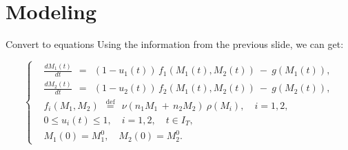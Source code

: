 \documentclass{beamer}
\begin{document}
\section{Modeling}

\begin{frame}{Convert to equations}
    Using the information from the previous slide, we can get:
    
    $$ 
    \left\{ \begin{aligned}
    & \frac{d M_1(t)}{dt} \:\: = \:\: (1 - u_1(t)) \, f_1(M_1(t), M_2(t)) \: - \: g(M_1(t)), \\
    & \frac{d M_2(t)}{dt} \:\: = \:\: (1 - u_2(t)) \, f_2(M_1(t), M_2(t)) \: - \: g(M_2(t)), \\
    & f_i(M_1, M_2) \:\: \stackrel{\mathrm{def}}{=} \:\: \nu(n_1 M_1 \, + \, n_2 M_2) \: \rho(M_i), \quad i = 1,2, \\
    & 0 \leqslant u_i(t) \leqslant 1, \quad i = 1,2, \quad t \in I_T, \\
    & M_1(0) = M_1^0, \quad M_2(0) = M_2^0.
    \end{aligned} \right.
    $$
\end{frame}
\end{document}
